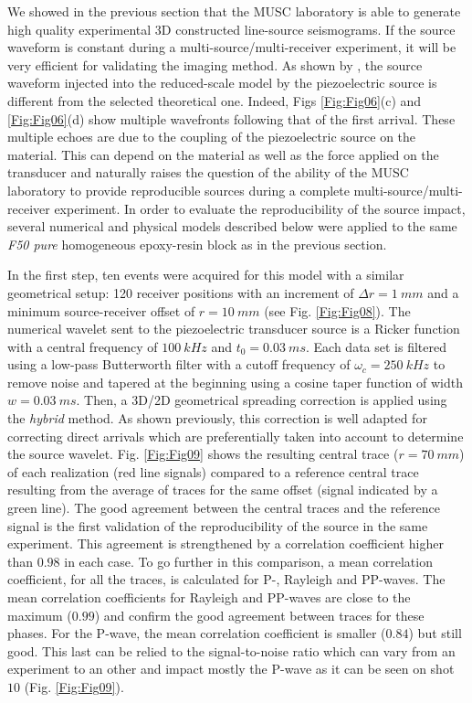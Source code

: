 \documentclass[extra,mreferee]{gji}
\begin{document}
We showed in the previous section that the MUSC laboratory is able to generate high quality experimental 3D constructed line-source seismograms. If the source waveform is constant during a multi-source/multi-receiver experiment, it will be very efficient for validating the imaging method. As shown by \cite{bretaudeau2011ssm}, the source waveform injected into the reduced-scale model by the piezoelectric source is different from the selected theoretical one. Indeed, Figs \ref{Fig:Fig06}(c) and \ref{Fig:Fig06}(d) show multiple wavefronts following that of the first arrival. These multiple echoes are due to the coupling of the piezoelectric source on the material. This can depend on the material as well as the force applied on the transducer and naturally raises the question of the ability of the MUSC laboratory to provide reproducible sources during a complete multi-source/multi-receiver experiment. In order to evaluate the reproducibility of the source impact, several numerical and physical models described below were applied to the same \textit{F50 pure} homogeneous epoxy-resin block as in the previous section.

In the first step, ten events were acquired for this model with a similar geometrical setup: 120 receiver positions with an increment of $\Delta r= 1\ mm$ and a minimum source-receiver offset of $r=10\ mm$ (see Fig. \ref{Fig:Fig08}). The numerical wavelet sent to the piezoelectric transducer source is a Ricker function with a central frequency of $100\ kHz$ and $t_{0}=0.03\ ms$. Each data set is filtered using a low-pass Butterworth filter with a cutoff frequency of $\omega_{c}=250\ kHz$ to remove noise and tapered at the beginning using a cosine taper function of width $w=0.03\ ms$. Then, a 3D/2D geometrical spreading correction is applied using the \textit{hybrid} method. As shown previously, this correction is well adapted for correcting direct arrivals which are preferentially taken into account to determine the source wavelet. Fig. \ref{Fig:Fig09} shows the resulting central trace ($r=70\ mm$) of each realization (red line signals) compared to a reference central trace resulting from the average of traces for the same offset (signal indicated by a green line). The good agreement between the central traces and the reference signal is the first validation of the reproducibility of the source in the same experiment. This agreement is strengthened by a correlation coefficient higher than $0.98$ in each case. To go further in this comparison, a mean correlation coefficient, for all the traces, is calculated for P-, Rayleigh and PP-waves. The mean correlation coefficients for Rayleigh and PP-waves are close to the maximum ($0.99$) and confirm the good agreement between traces for these phases. For the P-wave, the mean correlation coefficient is smaller ($0.84$) but still good. This last can be relied to the signal-to-noise ratio which can vary from an experiment to an other and impact mostly the P-wave as it can be seen on shot $10$ (Fig. \ref{Fig:Fig09}).
\end{document}
